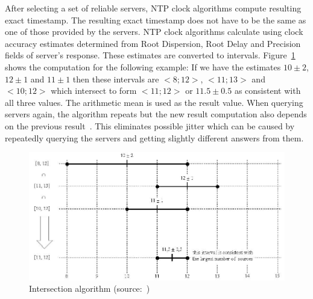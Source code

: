 After selecting a set of reliable servers, NTP clock algorithms compute resulting exact timestamp.
The resulting exact timestamp does not have to be the same
as one of those provided by the servers.
NTP clock algorithms calculate using clock accuracy estimates
determined from Root Dispersion, Root Delay and Precision fields of server's response.
These estimates are converted to intervals.
Figure~\ref{fig:ntp-intersection} shows the computation for the following example:
If we have the estimates $10 \pm 2$, $12 \pm 1$ and $11 \pm 1$
then these intervals are $<8; 12>$, $<11; 13>$ and $<10; 12>$ which
intersect to form $<11; 12>$ or $11.5 \pm 0.5$ as consistent with all three values.
The arithmetic mean is used as the result value.
When querying servers again, the algorithm repeats but the new result computation
also depends on the previous result~\cite{rfc5905,ntp-history}.
This eliminates possible jitter which can be caused by repeatedly querying the servers
and getting slightly different answers from them.

\begin{figure}
	\centering
	\includegraphics[width=13cm,keepaspectratio]{fig/Marzullo_example-1.jpg}
	\caption{Intersection algorithm (source:~\cite{wikipedia-marzullo})}
	\label{fig:ntp-intersection}
	\bigskip
\end{figure}

